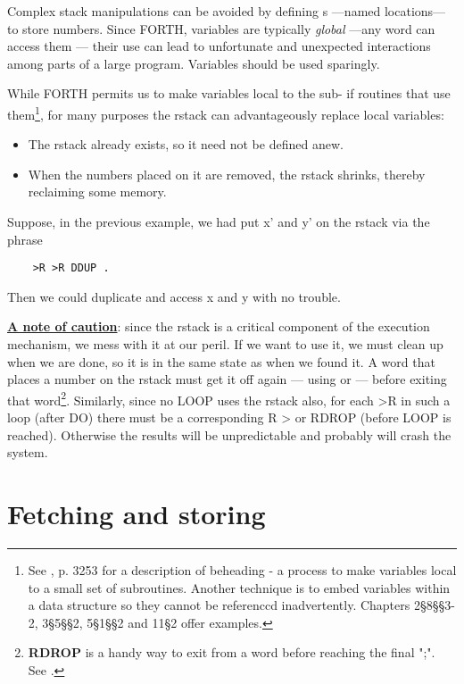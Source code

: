 Complex stack manipulations can be avoided by defining s —named locations— to store numbers. Since FORTH, variables are typically \textit{global} —any word can access them — their use can lead to unfortunate and unexpected interactions among parts of a large program. Variables should be used sparingly.

While FORTH permits us to make variables local to the sub- if routines that use them\footnote{See \FTR, p. 3253 for a description of beheading - a process to make variables local to a small set of subroutines. Another technique is to embed variables within a data structure so they cannot be referenccd inadvertently. Chapters 2§8§§3-2, 3§5§§2, 5§1§§2 and 11§2 offer examples.}, for many purposes the rstack can advantageously replace local variables:

\begin{itemize}
    \item The rstack already exists, so it need not be defined anew.
    \item When the numbers placed on it are removed, the rstack shrinks, thereby reclaiming some memory.
\end{itemize}

Suppose, in the previous example, we had put x’ and y’ on the rstack via the phrase

\begin{lstlisting}
    >R >R DDUP .
\end{lstlisting}

Then we could duplicate and access x and y with no trouble.

\leftbar[1\linewidth]
\underline{\textbf{A note of caution}}: since the rstack is a critical component of the execution mechanism, we mess with it at our peril. If we want to use it, we must clean up when we are done, so it is in the same state as when we found it. A word that places a number on the rstack must get it off again — using  or  — before exiting that word\footnote{\textbf{RDROP} is a handy way to exit from a word before reaching the final ";". See \TF.}. Similarly, since no LOOP uses the rstack also, for each >R in such a loop (after DO) there must be a corresponding R > or RDROP (before LOOP is reached). Otherwise the results will be unpredictable and probably will crash the system.
\endleftbar

\section{Fetching and storing}

